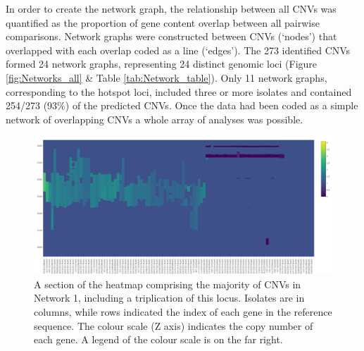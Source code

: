\documentclass{article}
\begin{document}



In order to create the network graph, the relationship between all CNVs was quantified as the proportion of gene content overlap between all pairwise comparisons. Network graphs were constructed between CNVs (‘nodes’) that overlapped with each overlap coded as a line (‘edges’). The 273 identified CNVs formed 24 network graphs, representing 24 distinct genomic loci (Figure \ref{fig:Networks_all} & Table \ref{tab:Network_table}). Only 11 network graphs, corresponding to the hotspot loci, included three or more isolates and contained 254/273 (93\%) of the predicted CNVs. Once the data had been coded as a simple network of overlapping CNVs a whole array of analyses was possible.

\begin{figure}[h!]
\centering
\includegraphics[width=\textwidth{}]{Chapter_1/heatmappy.png}
\caption{ A section of the heatmap comprising the majority of CNVs in Network 1, including a triplication of this locus. Isolates are in columns, while rows indicated the index of each gene in the reference sequence. The colour scale (Z axis) indicates the copy number of each gene. A legend of the colour scale is on the far right.}
\label{fig:Network_1_heatmap}
\end{figure}
\end{document}
